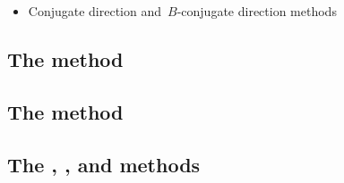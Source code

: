 


\begin{itemize}
    \item Conjugate direction and~$B$-conjugate direction methods~\cite{Powell_1964,Powell_1975a}
\end{itemize}

\subsection{The  method}
\label{subsec:cobyla}

\subsection{The  method}
\label{subsec:uobyqa}

\subsection{The , , and  methods}
\label{subsec:newuoa-bobyqa-lincoa}

